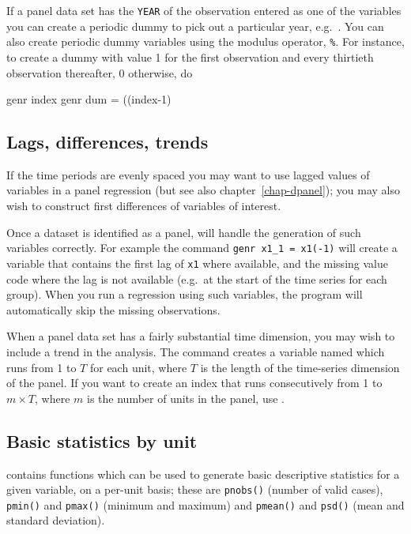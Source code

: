 If a panel data set has the \verb+YEAR+ of the observation entered as
one of the variables you can create a periodic dummy to pick out a
particular year, e.g.\ .  You can also
create periodic dummy variables using the modulus operator,
\verb+%+.  For instance, to create a dummy with
value 1 for the first observation and every thirtieth observation
thereafter, 0 otherwise, do
%
\begin{code}
genr index 
genr dum = ((index-1) %
\end{code}

\subsection{Lags, differences, trends}
\label{panel-lagged}

If the time periods are evenly spaced you may want to use lagged
values of variables in a panel regression (but see also
chapter~\ref{chap-dpanel}); you may also wish to construct first
differences of variables of interest.

Once a dataset is identified as a panel,  will handle the
generation of such variables correctly.  For example the command
\verb+genr x1_1 = x1(-1)+ will create a variable that contains the
first lag of \verb+x1+ where available, and the missing value code
where the lag is not available (e.g.\ at the start of the time series
for each group).  When you run a regression using such variables, the
program will automatically skip the missing observations.

When a panel data set has a fairly substantial time dimension, you may
wish to include a trend in the analysis.  The command  
creates a variable named  which runs from 1 to $T$ for
each unit, where $T$ is the length of the time-series dimension of the
panel.  If you want to create an index that runs consecutively from 1
to $m\times T$, where $m$ is the number of units in the panel, use
.

\subsection{Basic statistics by unit}
\label{panel-stats}

 contains functions which can be used to generate basic
descriptive statistics for a given variable, on a per-unit basis;
these are \texttt{pnobs()} (number of valid cases), \texttt{pmin()}
and \texttt{pmax()} (minimum and maximum) and \texttt{pmean()} and
\texttt{psd()} (mean and standard deviation).

